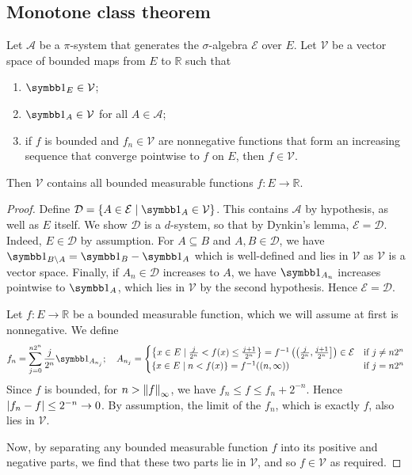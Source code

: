 \subsection{Monotone class theorem}
\begin{theorem}
	Let \( \mathcal A \) be a \( \pi \)-system that generates the \( \sigma \)-algebra \( \mathcal E \) over \( E \).
	Let \( \mathcal V \) be a vector space of bounded maps from \( E \) to \( \mathbb R \) such that
	\begin{enumerate}
		\item \( \symbb 1_E \in \mathcal V \);
		\item \( \symbb 1_A \in \mathcal V \) for all \( A \in \mathcal A \);
		\item if \( f \) is bounded and \( f_n \in \mathcal V \) are nonnegative functions that form an increasing sequence that converge pointwise to \( f \) on \( E \), then \( f \in \mathcal V \).
	\end{enumerate}
	Then \( \mathcal V \) contains all bounded measurable functions \( f \colon E \to \mathbb R \).
\end{theorem}
\begin{proof}
	Define \( \mathcal D = \qty{A \in \mathcal E \mid \symbb 1_A \in \mathcal V} \).
	This contains \( \mathcal A \) by hypothesis, as well as \( E \) itself.
	We show \( \mathcal D \) is a \( d \)-system, so that by Dynkin's lemma, \( \mathcal E = \mathcal D \).
	Indeed, \( E \in \mathcal D \) by assumption.
	For \( A \subseteq B \) and \( A, B \in \mathcal D \), we have \( \symbb 1_{B \setminus A} = \symbb 1_B - \symbb 1_A \) which is well-defined and lies in \( \mathcal V \) as \( \mathcal V \) is a vector space.
	Finally, if \( A_n \in \mathcal D \) increases to \( A \), we have \( \symbb 1_{A_n} \) increases pointwise to \( \symbb 1_A \), which lies in \( \mathcal V \) by the second hypothesis.
	Hence \( \mathcal E = \mathcal D \).

	Let \( f \colon E \to \mathbb R \) be a bounded measurable function, which we will assume at first is nonnegative.
	We define
	\[ f_n = \sum_{j=0}^{n2^n} \frac{j}{2^n} \symbb 1_{A_{n_j}};\quad A_{n_j} = \begin{cases}
		\qty{x \in E \mid \frac{j}{2^n} < f(x) \leq \frac{j+1}{2^n}} = f^{-1}\left(\left(\frac{j}{2^n}, \frac{j+1}{2^n}\right]\right) \in \mathcal E & \text{if } j \neq n2^n \\
		\qty{x \in E \mid n < f(x)} = f^{-1}((n,\infty)) & \text{if } j = n2^n
	\end{cases} \]
	Since \( f \) is bounded, for \( n > \norm{f}_{\infty} \), we have \( f_n \leq f \leq f_n + 2^{-n} \).
	Hence \( \abs{f_n - f} \leq 2^{-n} \to 0 \).
	By assumption, the limit of the \( f_n \), which is exactly \( f \), also lies in \( \mathcal V \).

	Now, by separating any bounded measurable function \( f \) into its positive and negative parts, we find that these two parts lie in \( \mathcal V \), and so \( f \in \mathcal V \) as required.
\end{proof}

